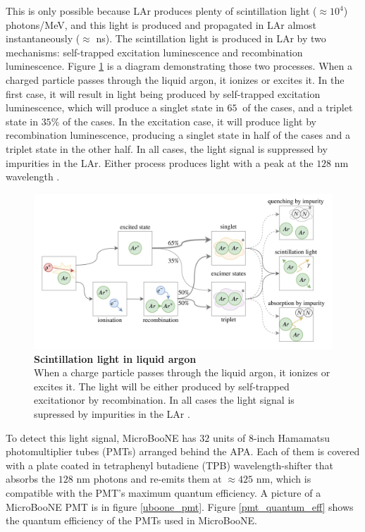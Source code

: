 This is only possible because LAr produces plenty of scintillation light ($\approx 10^4 $) photons/MeV, and this light is produced and propagated in LAr almost instantaneously ($\approx$ ns). The scintillation light is produced in LAr by two mechanisms: self-trapped excitation luminescence and recombination luminescence. Figure \ref{lar_excimers} is a diagram demonstrating those two processes. When a charged particle passes through the liquid argon, it ionizes or excites it. In the first case, it will result in light being produced by self-trapped excitation luminescence, which will produce a singlet state in $65\  $ of the cases, and a triplet state in $35\%$ of the cases. In the excitation case, it will produce light by recombination luminescence, producing a singlet state in half of the cases and a triplet state in the other half. In all cases, the light signal is suppressed by impurities in the LAr. Either process produces light with a peak at the $128$ nm wavelength \cite{lar_excimers}.
 
\begin{figure}[h!]
    \begin{center}
        \includegraphics[scale=0.35]{Figures/lar_excimers.png}
        \caption[Scintillation light in liquid argon]{{\textbf{Scintillation light in liquid argon}} \\When a charge particle passes through the liquid argon, it ionizes or excites it. The light will be either produced by self-trapped excitationor by recombination. In all cases the light signal is supressed by impurities in the LAr \cite{lar_excimers}.}
        \label{lar_excimers} 
    \end{center}
\end{figure}
  
To detect this light signal, MicroBooNE has $32$ units of 8-inch Hamamatsu photomultiplier tubes (PMTs) arranged behind the APA. Each of them is covered with a plate coated in tetraphenyl butadiene (TPB) wavelength-shifter that absorbs the $128$ nm photons and re-emits them at $\approx425$ nm, which is compatible with the PMT's maximum quantum efficiency. A picture of a MicroBooNE PMT is in figure \ref{uboone_pmt}. Figure \ref{pmt_quantum_eff} shows the quantum efficiency of the PMTs used in MicroBooNE. 
  
